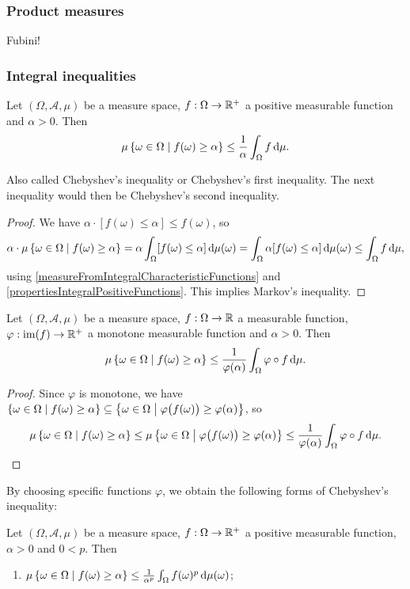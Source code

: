 \subsubsection{Product measures}
Fubini!


\subsubsection{Integral inequalities}
\begin{proposition}
Let $(\Omega, \mathcal{A}, \mu)$ be a measure space, $f:\Omega\to\mathbb{R}^+$ a positive measurable function and $\alpha>0$. Then
\[ \mu\left\{ \omega\in\Omega \;\middle|\; f(\omega)\geq \alpha \right\} \leq \frac{1}{\alpha}\int_\Omega f\operatorname{d \!}{\mu}. \]
\end{proposition}
Also called Chebyshev's inequality or Chebyshev's first inequality. The next inequality would then be Chebyshev's second inequality. 
\begin{proof}
We have $\alpha\cdot [f(\omega)\leq \alpha]\leq f(\omega)$, so
\[ \alpha\cdot \mu\left\{ \omega\in\Omega \;\middle|\; f(\omega)\geq \alpha \right\} = \alpha \int_{\Omega}[f(\omega)\leq \alpha]\operatorname{d \!}{\mu(\omega)} = \int_{\Omega}\alpha[f(\omega)\leq \alpha]\operatorname{d \!}{\mu(\omega)} \leq \int_\Omega f\operatorname{d \!}{\mu}, \]
using \ref{measureFromIntegralCharacteristicFunctions} and \ref{propertiesIntegralPositiveFunctions}. This implies Markov's inequality.
\end{proof}
\begin{corollary}
Let $(\Omega, \mathcal{A}, \mu)$ be a measure space, $f:\Omega\to\mathbb{R}$ a measurable function, $\varphi:\operatorname{im}(f) \to \mathbb{R}^+$ a monotone measurable function and $\alpha>0$. Then
\[ \mu\left\{ \omega\in\Omega \;\middle|\; f(\omega)\geq \alpha \right\} \leq \frac{1}{\varphi(\alpha)}\int_\Omega \varphi\circ f\operatorname{d \!}{\mu}. \]
\end{corollary}
\begin{proof}
Since $\varphi$ is monotone, we have $\left\{ \omega\in\Omega \;\middle|\; f(\omega)\geq \alpha \right\} \subseteq \left\{ \omega\in\Omega \;\middle|\; \varphi\big(f(\omega)\big)\geq \varphi(\alpha) \right\}$, so
\[ \mu\left\{ \omega\in\Omega \;\middle|\; f(\omega)\geq \alpha \right\} \leq \mu\left\{ \omega\in\Omega \;\middle|\; \varphi\big(f(\omega)\big)\geq \varphi(\alpha) \right\} \leq \frac{1}{\varphi(\alpha)}\int_\Omega \varphi\circ f\operatorname{d \!}{\mu}. \]
\end{proof}
By choosing specific functions $\varphi$, we obtain the following forms of Chebyshev's inequality:
\begin{corollary}
Let $(\Omega, \mathcal{A}, \mu)$ be a measure space, $f:\Omega\to\mathbb{R}^+$ a positive measurable function, $\alpha>0$ and $0<p$. Then
\begin{enumerate}
\item $\mu\left\{ \omega\in\Omega \;\middle|\; f(\omega)\geq \alpha \right\} \leq \frac{1}{\alpha^p}\int_\Omega f(\omega)^p\operatorname{d \!}{\mu(\omega)}$;
\end{enumerate}
\end{corollary}


